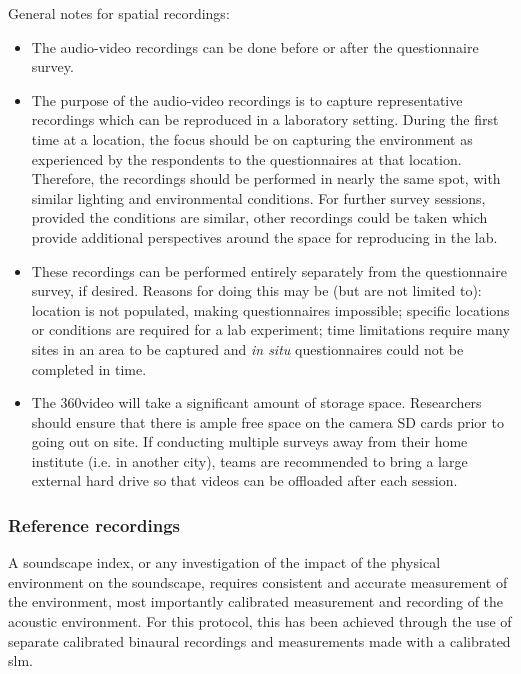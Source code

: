    General notes for spatial recordings:

   \begin{itemize}
     \item The audio-video recordings can be done before or after the questionnaire survey.
     \item The purpose of the audio-video recordings is to capture representative recordings which can be reproduced in a laboratory setting. During the first time at a location, the focus should be on capturing the environment as experienced by the respondents to the questionnaires at that location. Therefore, the recordings should be performed in nearly the same spot, with similar lighting and environmental conditions. For further survey sessions, provided the conditions are similar, other recordings could be taken which provide additional perspectives around the space for reproducing in the lab.
     \item These recordings can be performed entirely separately from the questionnaire survey, if desired. Reasons for doing this may be (but are not limited to): location is not populated, making questionnaires impossible; specific locations or conditions are required for a lab experiment; time limitations require many sites in an area to be captured and \textit{in situ} questionnaires could not be completed in time.
     \item The 360\degree video will take a significant amount of storage space. Researchers should ensure that there is ample free space on the camera SD cards prior to going out on site. If conducting multiple surveys away from their home institute (i.e. in another city), teams are recommended to bring a large external hard drive so that videos can be offloaded after each session.
   \end{itemize}

   \subsubsection{Reference recordings}

   A soundscape index, or any investigation of the impact of the physical environment on the soundscape, requires consistent and accurate measurement of the environment, most importantly calibrated measurement and recording of the acoustic environment. For this protocol, this has been achieved through the use of separate calibrated binaural recordings and measurements made with a calibrated \gls{slm}.




